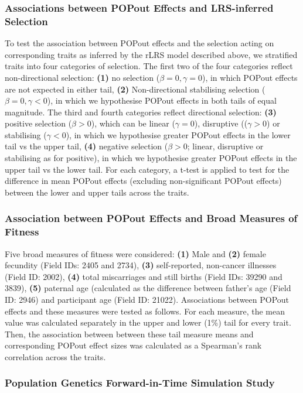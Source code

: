 \documentclass[12pt]{zHenriquesLab-StyleBioRxiv}
\begin{document}
{{\subsubsection*{Associations between POPout Effects and LRS-inferred Selection}
To test the association between POPout effects and the selection acting on 
corresponding traits as inferred by the rLRS model described above, we stratified 
traits into four categories of selection. The first two of the four categories reflect non-directional 
selection: \textbf{(1)} no selection ($\beta=0,\gamma=0$), in which POPout 
effects are not expected in either tail, \textbf{(2)} Non-directional stabilising 
selection ($\beta=0,\gamma<0$), in which we hypothesise POPout effects 
in both tails of equal magnitude. The third and fourth categories reflect directional selection: 
\textbf{(3)} positive selection ($\beta>0$), which can be linear ($\gamma=0$), disruptive 
(($\gamma>0$) or stabilising ($\gamma<0$), in which we hypothesise greater 
POPout effects in the lower tail vs the upper tail, \textbf{(4)} negative 
selection ($\beta>0$; linear, disruptive or stabilising as for positive), in which we 
hypothesise greater POPout effects in the upper tail vs the lower tail. For each category, 
a t-test is applied to test for the difference in mean POPout effects (excluding non-significant 
POPout effects) between the lower and upper tails across the traits.

\subsubsection*{Association between POPout Effects and Broad Measures of Fitness}
Five broad measures of fitness were considered: \textbf{(1)} Male and \textbf{(2)} female 
fecundity (Field IDs: 2405 and 2734), \textbf{(3)} self-reported, non-cancer illnesses 
(Field ID: 2002), \textbf{(4)} total miscarriages and still births (Field IDs: 39290 and 3839), 
\textbf{(5)} paternal age (calculated as the difference between father's age (Field ID: 2946) 
and participant age (Field ID: 21022). Associations between POPout effects and these 
measures were tested as follows. For each measure, the mean value was calculated 
separately in the upper and lower (1\%) tail for every trait. Then, the association between 
between these tail measure means and corresponding POPout effect sizes was 
calculated as a Spearman's rank correlation across the traits.



\subsubsection*{Population Genetics Forward-in-Time Simulation Study} \label{sec:methods:sims} 

}}
\end{document}
